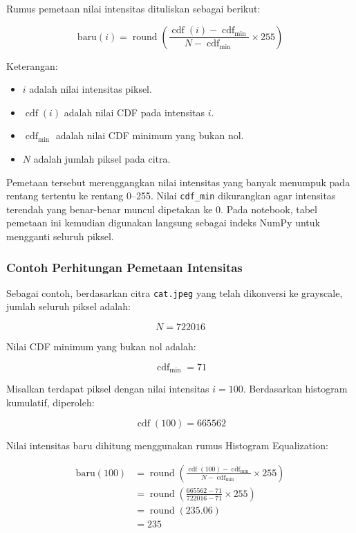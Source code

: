\documentclass[12pt,a4paper]{article}
\begin{document}
Rumus pemetaan nilai intensitas dituliskan sebagai berikut:

\begin{equation}
    \text{baru}(i) = \operatorname{round}\left(
    \frac{\operatorname{cdf}(i)-\operatorname{cdf}_{\min}}
    {N-\operatorname{cdf}_{\min}} \times 255
    \right)
\end{equation}

Keterangan:
\begin{itemize}
    \item $i$ adalah nilai intensitas piksel.
    \item $\operatorname{cdf}(i)$ adalah nilai CDF pada intensitas $i$.
    \item $\operatorname{cdf}_{\min}$ adalah nilai CDF minimum yang bukan nol.
    \item $N$ adalah jumlah piksel pada citra.
\end{itemize}

Pemetaan tersebut merenggangkan nilai intensitas yang banyak menumpuk pada rentang tertentu ke rentang 0--255. Nilai \texttt{cdf\_min} dikurangkan agar intensitas terendah yang benar-benar muncul dipetakan ke 0. Pada notebook, tabel pemetaan ini kemudian digunakan langsung sebagai indeks NumPy untuk mengganti seluruh piksel.

\subsubsection{Contoh Perhitungan Pemetaan Intensitas}

Sebagai contoh, berdasarkan citra \texttt{cat.jpeg} yang telah dikonversi ke grayscale, jumlah seluruh piksel adalah:

\[
N = 722016
\]

Nilai CDF minimum yang bukan nol adalah:

\[
\operatorname{cdf}_{\min}=71
\]

Misalkan terdapat piksel dengan nilai intensitas $i=100$. Berdasarkan histogram kumulatif, diperoleh:

\[
\operatorname{cdf}(100)=665562
\]

Nilai intensitas baru dihitung menggunakan rumus Histogram Equalization:

\[
\begin{aligned}
\text{baru}(100)
&=\operatorname{round}\left(
\frac{\operatorname{cdf}(100)-\operatorname{cdf}_{\min}}
{N-\operatorname{cdf}_{\min}}
\times 255
\right)\\
&=\operatorname{round}\left(
\frac{665562-71}{722016-71}
\times 255
\right)\\
&=\operatorname{round}(235.06)\\
&=235
\end{aligned}
\]
\end{document}

